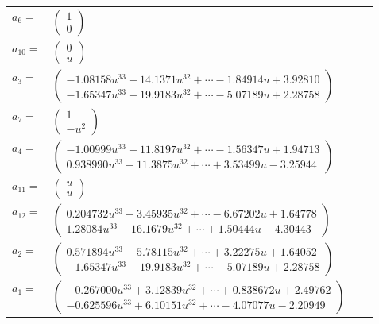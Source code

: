 \documentclass[1p]{elsarticle_modified}
\theoremstyle{definition}
\begin{document}
\begin{tabular}{m{7pt} m{180pt} m{7pt} m{180pt} }
\flushright $a_{6}=$&$\begin{pmatrix}1\\0\end{pmatrix}$ \\
\flushright $a_{10}=$&$\begin{pmatrix}0\\u\end{pmatrix}$ \\
\flushright $a_{3}=$&$\begin{pmatrix}-1.08158 u^{33}+14.1371 u^{32}+\cdots-1.84914 u+3.92810\\-1.65347 u^{33}+19.9183 u^{32}+\cdots-5.07189 u+2.28758\end{pmatrix}$ \\
\flushright $a_{7}=$&$\begin{pmatrix}1\\- u^2\end{pmatrix}$ \\
\flushright $a_{4}=$&$\begin{pmatrix}-1.00999 u^{33}+11.8197 u^{32}+\cdots-1.56347 u+1.94713\\0.938990 u^{33}-11.3875 u^{32}+\cdots+3.53499 u-3.25944\end{pmatrix}$ \\
\flushright $a_{11}=$&$\begin{pmatrix}u\\u\end{pmatrix}$ \\
\flushright $a_{12}=$&$\begin{pmatrix}0.204732 u^{33}-3.45935 u^{32}+\cdots-6.67202 u+1.64778\\1.28084 u^{33}-16.1679 u^{32}+\cdots+1.50444 u-4.30443\end{pmatrix}$ \\
\flushright $a_{2}=$&$\begin{pmatrix}0.571894 u^{33}-5.78115 u^{32}+\cdots+3.22275 u+1.64052\\-1.65347 u^{33}+19.9183 u^{32}+\cdots-5.07189 u+2.28758\end{pmatrix}$ \\
\flushright $a_{1}=$&$\begin{pmatrix}-0.267000 u^{33}+3.12839 u^{32}+\cdots+0.838672 u+2.49762\\-0.625596 u^{33}+6.10151 u^{32}+\cdots-4.07077 u-2.20949\end{pmatrix}$ \\

\end{tabular}
\end{document}
